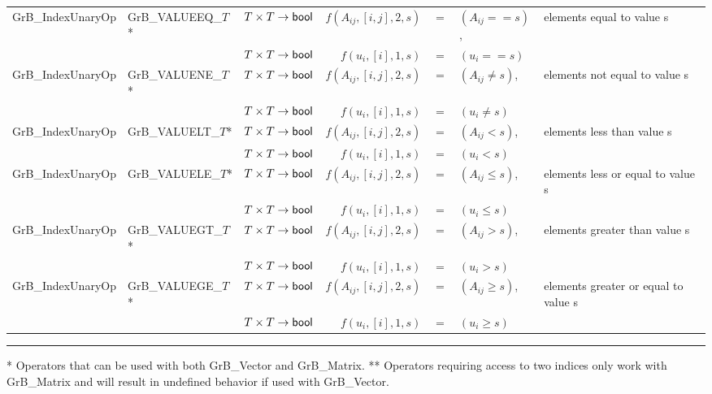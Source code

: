 \begin{landscape}
\begin{table}
\begin{threeparttable}
\begin{tabular}{l|l|l|rcll}
{\sf GrB\_IndexUnaryOp}   & {\sf GrB\_VALUEEQ\_$T$}*  & $T \times T \rightarrow {\sf bool} $ & $f(A_{ij},[i,j],2,s)$ & $=$ & $(A_{ij} == s)$, & elements equal to value s \\
                          &                            & $T \times T \rightarrow {\sf bool} $ & $f(u_{i},[i],1,s)$ & $=$ & $(u_{i} == s)$ \\
{\sf GrB\_IndexUnaryOp}   & {\sf GrB\_VALUENE\_$T$}*  & $T \times T \rightarrow {\sf bool} $ & $f(A_{ij},[i,j],2,s)$ & $=$ & $(A_{ij} \neq s)$, & elements not equal to value s \\
                          &                            & $T \times T \rightarrow {\sf bool} $ & $f(u_{i},[i],1,s)$ & $=$ & $(u_{i} \neq s)$ \\
{\sf GrB\_IndexUnaryOp}   & {\sf GrB\_VALUELT\_$T$}*  & $T \times T \rightarrow {\sf bool} $ & $f(A_{ij},[i,j],2,s)$ & $=$ & $(A_{ij} < s)$, & elements less than value s \\
                          &                            & $T \times T \rightarrow {\sf bool} $ & $f(u_{i},[i],1,s)$ & $=$ & $(u_{i} < s)$ \\
{\sf GrB\_IndexUnaryOp}   & {\sf GrB\_VALUELE\_$T$}*  & $T \times T \rightarrow {\sf bool} $ & $f(A_{ij},[i,j],2,s)$ & $=$ & $(A_{ij} \leq s)$, & elements less or equal to value s \\
                          &                            & $T \times T \rightarrow {\sf bool} $ & $f(u_{i},[i],1,s)$ & $=$ & $(u_{i} \leq s)$ \\
{\sf GrB\_IndexUnaryOp}   & {\sf GrB\_VALUEGT\_$T$}*  & $T \times T \rightarrow {\sf bool} $ & $f(A_{ij},[i,j],2,s)$ & $=$ & $(A_{ij} > s)$, & elements greater than value s \\
                          &                            & $T \times T \rightarrow {\sf bool} $ & $f(u_{i},[i],1,s)$ & $=$ & $(u_{i} > s)$ \\
{\sf GrB\_IndexUnaryOp}   & {\sf GrB\_VALUEGE\_$T$}*  & $T \times T \rightarrow {\sf bool} $ & $f(A_{ij},[i,j],2,s)$ & $=$ & $(A_{ij} \geq s)$, & elements greater or equal to value s \\
                          &                            & $T \times T \rightarrow {\sf bool} $ & $f(u_{i},[i],1,s)$ & $=$ & $(u_{i} \geq s)$ \\
\end{tabular}
\hrule
{\footnotesize
\hspace{0.065in}* Operators that can be used with both {\sf GrB\_Vector} and {\sf GrB\_Matrix}.\newline 
** Operators requiring access to two indices only work with {\sf GrB\_Matrix} and will result in undefined behavior if used with {\sf GrB\_Vector}.
}
\end{threeparttable}
\end{table}



\end{landscape}

